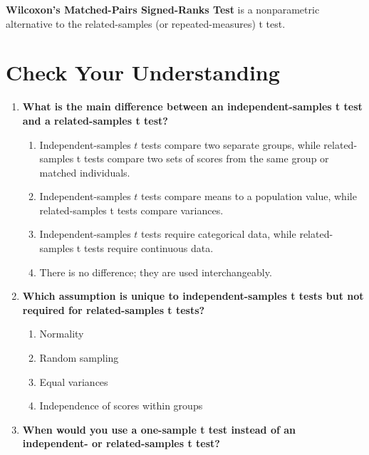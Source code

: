 \documentclass[
  letterpaper,
  DIV=11,
  numbers=noendperiod]{scrreprt}
\begin{document}
\textbf{Wilcoxon's Matched-Pairs Signed-Ranks Test} is a nonparametric
alternative to the related-samples (or repeated-measures) t test.

\section*{Check Your Understanding}\label{check-your-understanding-8}


\begin{enumerate}
\def\labelenumi{\arabic{enumi}.}
\item
  \textbf{What is the main difference between an independent-samples t
  test and a related-samples t test?}

  \begin{enumerate}
  \def\labelenumii{\alph{enumii}.}
  \item
    Independent-samples \(t\) tests compare two separate groups, while
    related-samples t tests compare two sets of scores from the same
    group or matched individuals.
  \item
    Independent-samples \(t\) tests compare means to a population value,
    while related-samples t tests compare variances.
  \item
    Independent-samples \(t\) tests require categorical data, while
    related-samples t tests require continuous data.
  \item
    There is no difference; they are used interchangeably.
  \end{enumerate}
\item
  \textbf{Which assumption is unique to independent-samples t tests but
  not required for related-samples t tests?}

  \begin{enumerate}
  \def\labelenumii{\alph{enumii}.}
  \item
    Normality
  \item
    Random sampling
  \item
    Equal variances
  \item
    Independence of scores within groups
  \end{enumerate}
\item
  \textbf{When would you use a one-sample t test instead of an
  independent- or related-samples t test?}


\end{enumerate}
\end{document}
